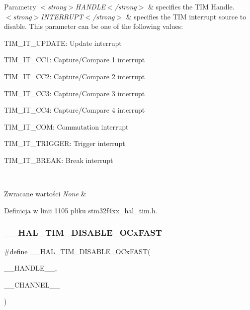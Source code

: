 \begin{DoxyParams}{Parametry}
{\em $<$strong$>$\+H\+A\+N\+D\+L\+E$<$/strong$>$} & specifies the T\+IM Handle. \\
\hline
{\em $<$strong$>$\+I\+N\+T\+E\+R\+R\+U\+P\+T$<$/strong$>$} & specifies the T\+IM interrupt source to disable. This parameter can be one of the following values\+: \begin{DoxyItemize}
\item T\+I\+M\+\_\+\+I\+T\+\_\+\+U\+P\+D\+A\+TE\+: Update interrupt \item T\+I\+M\+\_\+\+I\+T\+\_\+\+C\+C1\+: Capture/\+Compare 1 interrupt \item T\+I\+M\+\_\+\+I\+T\+\_\+\+C\+C2\+: Capture/\+Compare 2 interrupt \item T\+I\+M\+\_\+\+I\+T\+\_\+\+C\+C3\+: Capture/\+Compare 3 interrupt \item T\+I\+M\+\_\+\+I\+T\+\_\+\+C\+C4\+: Capture/\+Compare 4 interrupt \item T\+I\+M\+\_\+\+I\+T\+\_\+\+C\+OM\+: Commutation interrupt \item T\+I\+M\+\_\+\+I\+T\+\_\+\+T\+R\+I\+G\+G\+ER\+: Trigger interrupt \item T\+I\+M\+\_\+\+I\+T\+\_\+\+B\+R\+E\+AK\+: Break interrupt \end{DoxyItemize}
\\
\hline
\end{DoxyParams}

\begin{DoxyRetVals}{Zwracane wartości}
{\em None} & \\
\hline
\end{DoxyRetVals}


Definicja w linii 1105 pliku stm32f4xx\+\_\+hal\+\_\+tim.\+h.

\mbox{\label{group___t_i_m___exported___macros_gab9f8dc78886759192b5f044c7b9b0aa7}} 
\subsubsection{\texorpdfstring{\+\_\+\+\_\+\+H\+A\+L\+\_\+\+T\+I\+M\+\_\+\+D\+I\+S\+A\+B\+L\+E\+\_\+\+O\+Cx\+F\+A\+ST}{\_\_HAL\_TIM\_DISABLE\_OCxFAST}}
{\footnotesize\ttfamily \#define \+\_\+\+\_\+\+H\+A\+L\+\_\+\+T\+I\+M\+\_\+\+D\+I\+S\+A\+B\+L\+E\+\_\+\+O\+Cx\+F\+A\+ST(\begin{DoxyParamCaption}\item[{}]{\+\_\+\+\_\+\+H\+A\+N\+D\+L\+E\+\_\+\+\_\+,  }\item[{}]{\+\_\+\+\_\+\+C\+H\+A\+N\+N\+E\+L\+\_\+\+\_\+ }\end{DoxyParamCaption})}

